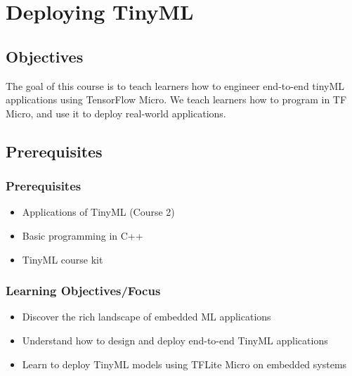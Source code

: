 


\chapter{Deploying TinyML}


\section{Objectives}

The goal of this course is to teach learners how to engineer end-to-end tinyML applications using TensorFlow Micro. We teach learners how to program in TF Micro, and use it to deploy real-world applications.

\section{Prerequisites}

\subsection{Prerequisites}

\begin{itemize}
  \item  Applications of TinyML (Course 2)
  \item Basic programming in C++
  \item TinyML course kit
\end{itemize}

\subsection{Learning Objectives/Focus}

\begin{itemize}
  \item Discover the rich landscape of embedded ML applications
  \item Understand how to design and deploy end-to-end TinyML applications
  \item Learn to deploy TinyML models using TFLite Micro on embedded systems
\end{itemize}

